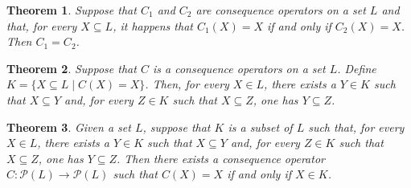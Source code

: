 \documentclass[12pt]{article}
\newtheorem{theorem}{Theorem}
\begin{document}
\begin{theorem}
Suppose that $C_1$ and $C_2$ are consequence operators on a set $L$ and that,
for every $X \subseteq L$, it happens that $C_1 (X) = X$ if and only if $C_2 (X)
= X$.  Then $C_1 = C_2$.
\end{theorem}

\begin{theorem}
Suppose that $C$ is a consequence operators on a set $L$.  Define $K = \{ X 
\subseteq L \mid C(X) = X\}$.  Then, for every $X \in L$, there exists a $Y \in K$
such that $X \subseteq Y$ and, for every $Z \in K$ such that $X \subseteq Z$, 
one has $Y \subseteq Z$.
\end{theorem}

\begin{theorem}
Given a set $L$, suppose that $K$ is a subset of $L$ such that, for every $X \in L$, there exists a $Y \in K$ such that $X \subseteq Y$ and, for every $Z \in K$ such that $X \subseteq Z$, one has $Y \subseteq Z$.  Then there exists a 
consequence operator $C \colon \mathcal{P}(L) \to \mathcal{P}(L)$ such that $C(X) = X$ if and only if $X \in K$.
\end{theorem}
\end{document}
